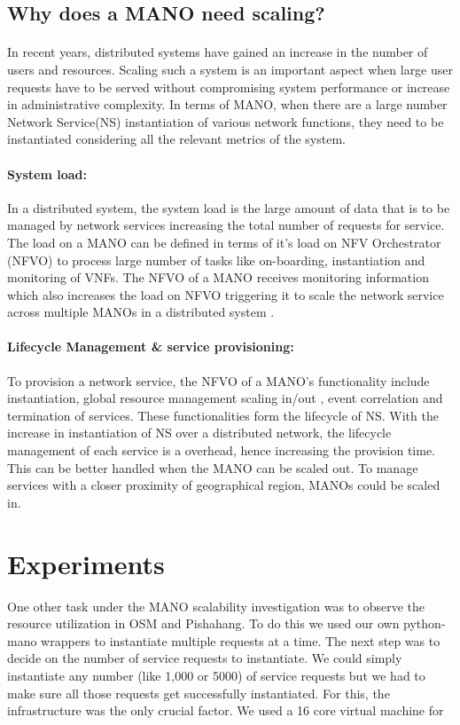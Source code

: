 \subsection{Why does a MANO need scaling?}
\paragraph{}
In recent years, distributed systems have gained an increase in the number of users and resources. Scaling such a system is an important aspect when large user requests have to be served without compromising system performance or increase in administrative complexity. In terms of MANO, when there are a large number Network Service(NS) instantiation of various network functions, they need to be instantiated considering all the relevant metrics of the system.

\paragraph{System load:}
In a distributed system, the system load is the large amount of data that is to be managed by network services increasing the total number of requests for service.
The load on a MANO can be defined in terms of it's load on NFV Orchestrator (NFVO) to process large number of tasks like on-boarding, instantiation and monitoring of VNFs. The NFVO of a MANO receives monitoring information which also increases the load on NFVO triggering it to scale the network service across multiple MANOs in a distributed system \cite{soenen2017optimising}.


\paragraph{Lifecycle Management \& service provisioning:} To provision a network service, the NFVO of a MANO's functionality include instantiation, global resource management scaling in/out , event correlation and termination of services. These functionalities form the lifecycle of NS. With the increase in instantiation of NS over a distributed network, the lifecycle management of each service is a overhead, hence increasing the provision time. This can be better handled when the MANO can be scaled out. To manage services with a closer proximity of geographical region, MANOs could be scaled in.






\section{Experiments}
One other task under the MANO scalability investigation was to observe the resource utilization in OSM and Pishahang. To do this we used our own python-mano wrappers to instantiate multiple requests at a time. The next step was to decide on the number of service requests to instantiate. We could simply instantiate any number (like 1,000 or 5000) of service requests but we had to make sure all those requests get successfully instantiated. For this, the infrastructure was the only crucial factor. We used a 16 core virtual machine for 


